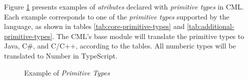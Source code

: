 \begin{examples}
Figure \ref{fig:ex:primitive-types} presents examples
of \emph{atributes} declared with \emph{primitive types} in CML.
Each example corresponds to one of the \emph{primitive types} 
supported by the language,
as shown in tables \ref{tab:core-primitive-types} and \ref{tab:additional-primitive-types}.
The CML's base module will translate the primitive types to Java, C\#, and C/C++,
according to the tables.
All numberic types will be translated to Number in TypeScript. 

\end{examples}

\begin{figure}
\verbatimfont{\small}

\caption{Example of \emph{Primitive Types}}
\label{fig:ex:primitive-types}
\end{figure}

